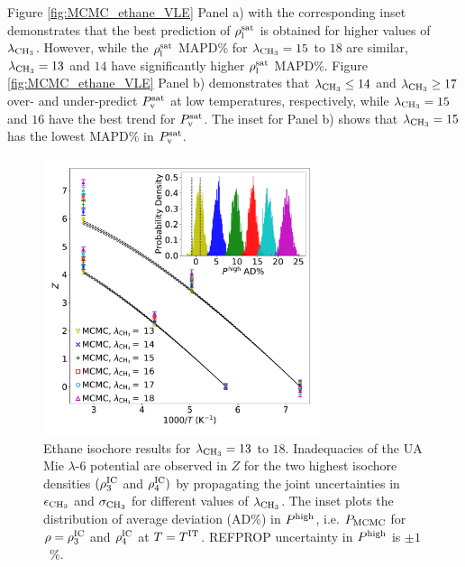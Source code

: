\documentclass[preprint,letterpaper,floatfix,citeautoscript,aip,jcp]{revtex4-1}
\begin{document}
Figure \ref{fig:MCMC_ethane_VLE} Panel a) with the corresponding inset demonstrates that the best prediction of $\rho_{\rm l}^{\rm sat}$ is obtained for higher values of $\lambda_{\rm CH_3}$. However, while the $\rho_{\rm l}^{\rm sat}$ MAPD\% for $\lambda_{\rm CH_3} = 15$ to $18$ are similar, $\lambda_{\rm CH_3} = 13$ and $14$ have significantly higher $\rho_{\rm l}^{\rm sat}$ MAPD\%. Figure \ref{fig:MCMC_ethane_VLE} Panel b) demonstrates that $\lambda_{\rm CH_3} \leq 14$ and $\lambda_{\rm CH_3} \geq 17$ over- and under-predict $P_{\rm v}^{\rm sat}$ at low temperatures, respectively, 
while $\lambda_{\rm CH_3} = 15$ and $16$ have the best trend for $P_{\rm v}^{\rm sat}$. The inset for Panel b) shows that $\lambda_{\rm CH_3} = 15$ has the lowest MAPD\% in $P_{\rm v}^{\rm sat}$.

\begin{figure}[htb!]
	\centering
	\includegraphics[width=3.2in]{MCMC_ethane_Phigh}
	\caption{Ethane isochore results for $\lambda_{\rm CH_3} = 13$ to $18$. Inadequacies of the UA Mie $\lambda$-6 potential are observed in $Z$ for the two highest isochore densities $(\rho^{\rm IC}_3$ and $\rho^{\rm IC}_4)$ by propagating the joint uncertainties in $\epsilon_{\rm CH_3}$ and $\sigma_{\rm CH_3}$ for different values of $\lambda_{\rm CH_3}$. The inset plots the distribution of average deviation (AD\%) in $P^{\rm high}$, i.e. $P_{\rm MCMC}$ for $\rho = \rho^{\rm IC}_3$ and $\rho^{\rm IC}_4$ at $T = T^{\rm IT}$. REFPROP uncertainty in $P^{\rm high}$ is $\pm 1$~\%. \cite{LEMMON-RP91,Ethane2006} }
	\label{fig:MCMC_ethane_Phigh}
\end{figure} 
\end{document}
